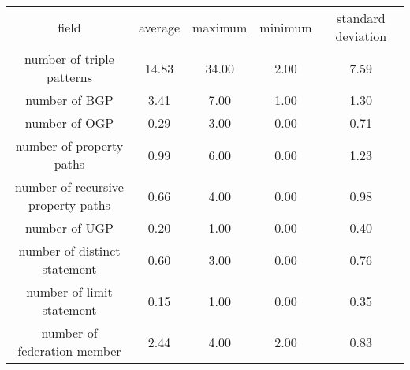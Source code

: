 \begin{center}
    \begin{tabular}{|*{5}{c|}}
     \hline
     field & average & maximum & minimum & standard deviation \\ 
     number of triple patterns & 14.83 & 34.00 & 2.00 & 7.59 \\ 
     number of BGP & 3.41 & 7.00 & 1.00 & 1.30 \\ 
     number of OGP & 0.29 & 3.00 & 0.00 & 0.71 \\ 
     number of property paths & 0.99 & 6.00 & 0.00 & 1.23 \\ 
     number of recursive property paths & 0.66 & 4.00 & 0.00 & 0.98 \\ 
     number of UGP & 0.20 & 1.00 & 0.00 & 0.40 \\ 
     number of distinct statement & 0.60 & 3.00 & 0.00 & 0.76 \\ 
     number of limit statement & 0.15 & 1.00 & 0.00 & 0.35 \\  
     number of federation member & 2.44 & 4.00 & 2.00 & 0.83 \\  
     \hline
    \end{tabular}
\end{center}
